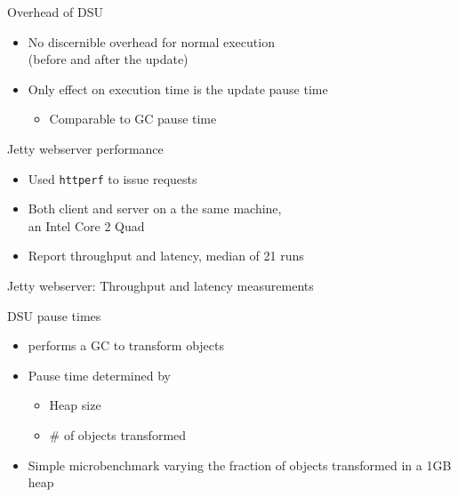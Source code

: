 \begin{frame}{Overhead of DSU}%
\begin{itemize}
\item No discernible overhead for normal execution \\
(before and after the update)
\item Only effect on execution time is the update pause time
  \begin{itemize}
  \item Comparable to GC pause time
  \end{itemize}
\end{itemize}
\end{frame}

\begin{frame}{Jetty webserver performance}%
\begin{itemize}
\item Used \texttt{httperf} to issue requests
\item Both client and server on a the same machine, \\
an Intel Core 2 Quad
\item Report throughput and latency, median of 21 runs
\end{itemize}
\end{frame}

\begin{frame}{Jetty webserver: Throughput and latency measurements}%
\begin{center}%
%
\end{center}%
\end{frame}

\begin{frame}{DSU pause times}%
\begin{itemize}
\item \DSU{} performs a GC to transform objects
\item Pause time determined by
  \begin{itemize}
  \item Heap size
  \item \# of objects transformed
  \end{itemize}
\item Simple microbenchmark varying the fraction of objects transformed in
a 1GB heap
\end{itemize}
\end{frame}

